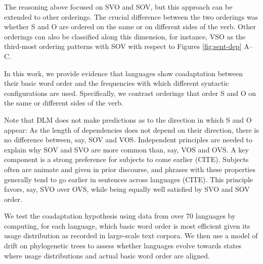 \documentclass[11pt,a4paper]{article}
\newcommand\comment[1]{{\color{red}#1}}
\begin{document}
The reasoning above focused on SVO and SOV, but this approach can be extended to other orderings.
The crucial difference between the two orderings was whether S and O are ordered on the same or on different sides of the verb.
Other orderings can also be classified along this dimension, for instance, VSO as the third-most ordering patterns with SOV with respect to Figures \ref{fig:sent-dep} A--C.

In this work, we provide evidence that languages show coadaptation between their basic word order and the frequencies with which different syntactic configurations are used.
Specifically, we contrast orderings that order S and O on the same or different sides of the verb.

Note that DLM does not make predictions as to the direction in which S and O appear: As the length of dependencies does not depend on their direction, there is no difference between, say, SOV and VOS.
Independent principles are needed to explain why SOV and SVO are more common than, say, VOS and OVS.
A key component is a strong preference for subjects to come earlier (CITE).
Subjects often are animate and given in prior discourse, and phrases with these properties generally tend to go earlier in sentences across languages (CITE).
This principle favors, say, SVO over OVS, while being equally well satisfied by SVO and SOV order.




We test the coadaptation hypothesis using data from over 70 languages by computing, for each language, which basic word order is most efficient given its usage distribution as recorded in large-scale text corpora.
We then use a model of drift on phylogenetic trees to assess whether languages evolve towards states where usage distributions and actual basic word order are aligned.



\end{document}
